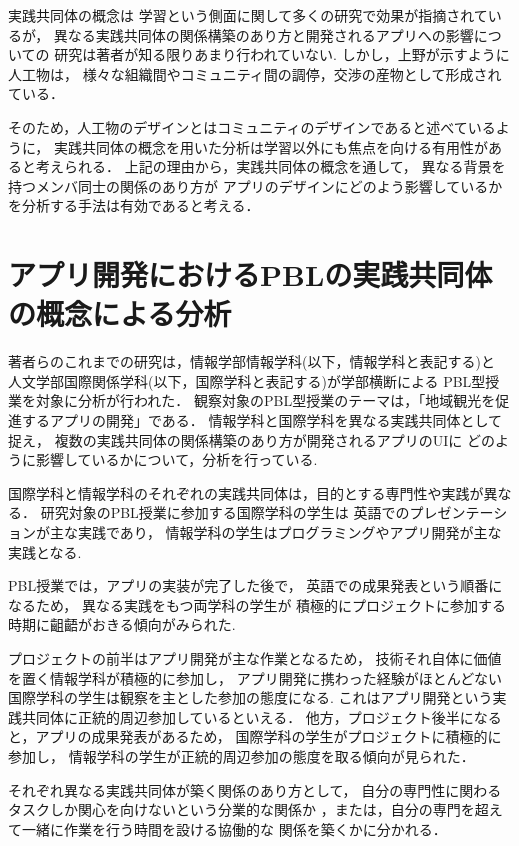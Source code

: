 \documentclass[twoside]{wiss}
\begin{document}
実践共同体の概念は
学習という側面に関して多くの研究で効果が指摘されているが，
異なる実践共同体の関係構築のあり方と開発されるアプリへの影響についての
研究は著者が知る限りあまり行われていない.
しかし，上野\cite{uenoArt}が示すように人工物は，
様々な組織間やコミュニティ間の調停，交渉の産物として形成されている．


そのため，人工物のデザインとはコミュニティのデザインであると述べているように，
実践共同体の概念を用いた分析は学習以外にも焦点を向ける有用性があると考えられる．
上記の理由から，実践共同体の概念を通して，
異なる背景を持つメンバ同士の関係のあり方が
アプリのデザインにどのよう影響しているかを分析する手法は有効であると考える．

\section{アプリ開発におけるPBLの実践共同体の概念による分析}
\label{previous-research-pbl}

著者らのこれまでの研究は，情報学部情報学科(以下，情報学科と表記する)と
人文学部国際関係学科(以下，国際学科と表記する)が学部横断による
PBL型授業を対象に分析が行われた．
観察対象のPBL型授業のテーマは，「地域観光を促進するアプリの開発」である．
情報学科と国際学科を異なる実践共同体として捉え，
複数の実践共同体の関係構築のあり方が開発されるアプリのUIに
どのように影響しているかについて，分析を行っている.

国際学科と情報学科のそれぞれの実践共同体は，目的とする専門性や実践が異なる．
研究対象のPBL授業に参加する国際学科の学生は
英語でのプレゼンテーションが主な実践であり，
情報学科の学生はプログラミングやアプリ開発が主な実践となる.
　

PBL授業では，アプリの実装が完了した後で，
英語での成果発表という順番になるため，
異なる実践をもつ両学科の学生が
積極的にプロジェクトに参加する時期に齟齬がおきる傾向がみられた.


プロジェクトの前半はアプリ開発が主な作業となるため，
技術それ自体に価値を置く情報学科が積極的に参加し，
アプリ開発に携わった経験がほとんどない国際学科の学生は観察を主とした参加の態度になる.
これはアプリ開発という実践共同体に正統的周辺参加しているといえる．
他方，プロジェクト後半になると，アプリの成果発表があるため，
国際学科の学生がプロジェクトに積極的に参加し，
情報学科の学生が正統的周辺参加の態度を取る傾向が見られた．

それぞれ異なる実践共同体が築く関係のあり方として，
自分の専門性に関わるタスクしか関心を向けないという分業的な関係か
，または，自分の専門を超えて一緒に作業を行う時間を設ける協働的な
関係を築くかに分かれる．
\end{document}
